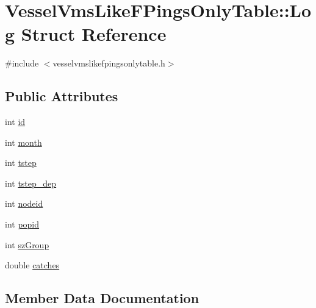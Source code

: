 \hypertarget{struct_vessel_vms_like_f_pings_only_table_1_1_log}{}\section{Vessel\+Vms\+Like\+F\+Pings\+Only\+Table\+::Log Struct Reference}
\label{struct_vessel_vms_like_f_pings_only_table_1_1_log}


{\ttfamily \#include $<$vesselvmslikefpingsonlytable.\+h$>$}

\subsection*{Public Attributes}
\begin{DoxyCompactItemize}
\item 
int \mbox{\hyperlink{struct_vessel_vms_like_f_pings_only_table_1_1_log_aafa220cd69fccc632ae34c915c19c231}{id}}
\item 
int \mbox{\hyperlink{struct_vessel_vms_like_f_pings_only_table_1_1_log_a900e7a314ea797fa7496afd3b808bf2e}{month}}
\item 
int \mbox{\hyperlink{struct_vessel_vms_like_f_pings_only_table_1_1_log_a12b5e317328055577b86a520fc1d05cc}{tstep}}
\item 
int \mbox{\hyperlink{struct_vessel_vms_like_f_pings_only_table_1_1_log_a0ec491dd25d2058323a6cd00bc64766c}{tstep\+\_\+dep}}
\item 
int \mbox{\hyperlink{struct_vessel_vms_like_f_pings_only_table_1_1_log_a80c148201a7d965bdd087ebdb9cb307f}{nodeid}}
\item 
int \mbox{\hyperlink{struct_vessel_vms_like_f_pings_only_table_1_1_log_a60a727c3d484bb9fe70ac1708ea02a03}{popid}}
\item 
int \mbox{\hyperlink{struct_vessel_vms_like_f_pings_only_table_1_1_log_ad8d185b13142291ca874f76f5746281f}{sz\+Group}}
\item 
double \mbox{\hyperlink{struct_vessel_vms_like_f_pings_only_table_1_1_log_a573f1e16eb8c1e78ac7779196771715f}{catches}}
\end{DoxyCompactItemize}


\subsection{Member Data Documentation}
\mbox{\label{struct_vessel_vms_like_f_pings_only_table_1_1_log_a573f1e16eb8c1e78ac7779196771715f}} 
